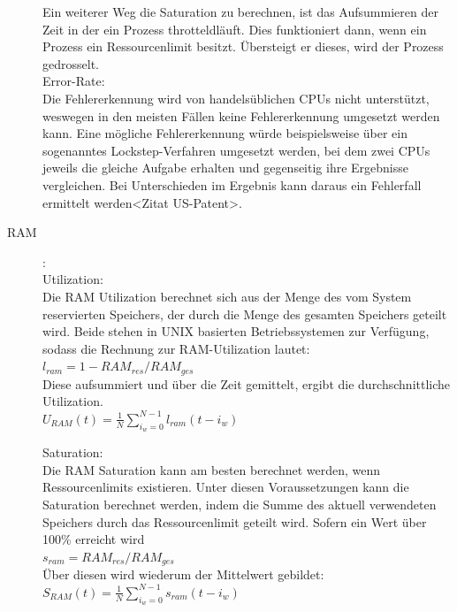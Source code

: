 \documentclass[a4paper,10pt]{scrartcl}
\begin{document}
\begin{description}
Ein weiterer Weg die Saturation zu berechnen, ist das Aufsummieren der Zeit in der ein Prozess \glqq throtteld\grqq läuft. Dies funktioniert dann, wenn ein Prozess ein Ressourcenlimit besitzt. Übersteigt er dieses, wird der Prozess gedrosselt.\\
Error-Rate:\\
Die Fehlererkennung wird von handelsüblichen CPUs nicht unterstützt, weswegen in den meisten Fällen keine Fehlererkennung umgesetzt werden kann. Eine mögliche Fehlererkennung würde beispielsweise über ein sogenanntes Lockstep-Verfahren umgesetzt werden, bei dem zwei CPUs jeweils die gleiche Aufgabe erhalten und gegenseitig ihre Ergebnisse vergleichen. Bei Unterschieden im Ergebnis kann daraus ein Fehlerfall ermittelt werden\cite{.}<Zitat US-Patent>.
\item[RAM]:\\
Utilization:\\
Die RAM Utilization berechnet sich aus der Menge des vom System reservierten Speichers, der durch die Menge des gesamten Speichers geteilt wird. Beide stehen in UNIX basierten Betriebssystemen zur Verfügung, sodass die Rechnung zur RAM-Utilization lautet:\\

\(
\displaystyle{l_{ram}=1-RAM_{res}/RAM_{ges}}
\) 
\\

Diese aufsummiert und über die Zeit gemittelt, ergibt die durchschnittliche Utilization.\\


\(
\displaystyle{U_{RAM}(t)=\frac{1}{N}{\sum\limits_{i_{w}=0}^{N-1} l_{ram}{(t-i_{w})}} }
\) 
\\

\pagebreak

Saturation:\\
Die RAM Saturation kann am besten berechnet werden, wenn Ressourcenlimits existieren. Unter diesen Voraussetzungen kann die Saturation berechnet werden, indem die Summe des aktuell verwendeten Speichers durch das Ressourcenlimit geteilt wird. Sofern ein Wert über 100\% erreicht wird\\


\(
\displaystyle{s_{ram}=RAM_{res}/RAM_{ges}}
\) 
\\

Über diesen wird wiederum der Mittelwert gebildet:\\


\(
\displaystyle{S_{RAM}(t)=\frac{1}{N}{\sum\limits_{i_{w}=0}^{N-1} s_{ram}{(t-i_{w})}} }
\) 
\\


\end{description}
\end{document}
